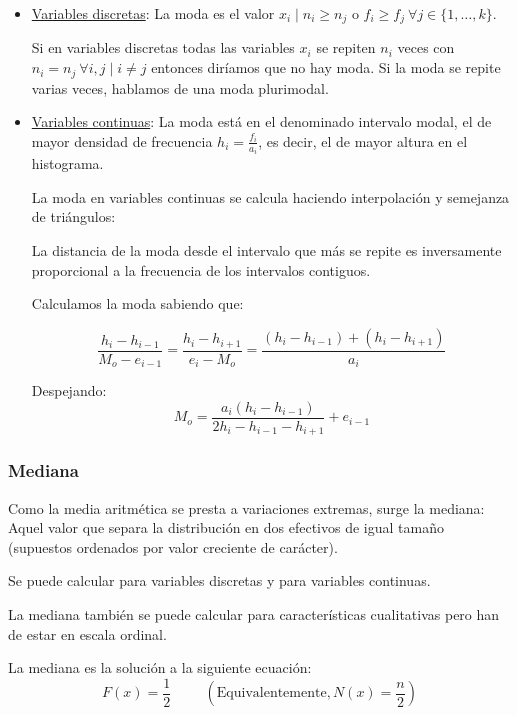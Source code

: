 \begin{itemize}
    \item \underline{Variables discretas}: La moda es el valor $x_i \mid n_i \geq n_j$ o $f_i \geq f_j \ \forall j \in \{1, \ldots, k\}$.

    Si en variables discretas todas las variables $x_i$ se repiten $n_i$ veces con $n_i = n_j \ \forall i,j \mid i \neq j$ entonces diríamos que no hay moda.
    Si la moda se repite varias veces, hablamos de una moda plurimodal.
    
    \item \underline{Variables continuas}: La moda está en el denominado intervalo modal, el de mayor densidad de frecuencia $h_i = \frac{f_i}{a_i}$, es decir, el de mayor altura en el histograma.
    
    La moda en variables continuas se calcula haciendo interpolación y semejanza de triángulos: 
    
    La distancia de la moda desde el intervalo que más se repite es inversamente proporcional a la frecuencia de los intervalos contiguos.


    Calculamos la moda sabiendo que:
    
    $$\dfrac{h_i - h_{i-1}}{M_o - e_{i-1}} = \dfrac{h_i - h_{i+1}}{e_i - M_o} = \dfrac{(h_i - h_{i-1}) + (h_i - h_{i+1})}{a_i}$$
    
    Despejando:
    $$M_o = \dfrac{a_i (h_i - h_{i-1})}{2h_i- h_{i-1} - h_{i+1}} + e_{i-1}$$
\end{itemize}


\subsubsection{Mediana}

Como la media aritmética se presta a variaciones extremas, surge la mediana: Aquel valor que separa la distribución en dos efectivos de igual tamaño (supuestos ordenados por valor creciente de carácter).

Se puede calcular para variables discretas y para variables continuas.

La mediana también se puede calcular para características cualitativas pero han de estar en escala ordinal.

La mediana es la solución a la siguiente ecuación: 
$$F(x) = \dfrac{1}{2} \hspace{1cm} \left(\text{Equivalentemente}, N(x) = \dfrac{n}{2}\right)$$


